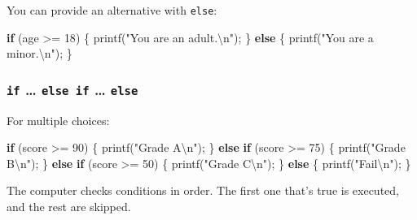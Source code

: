 \documentclass[
  letterpaper,
  DIV=11,
  numbers=noendperiod]{scrreprt}
\newenvironment{Shaded}{\begin{snugshade}}{\end{snugshade}}
\newcommand{\ControlFlowTok}[1]{\textcolor[rgb]{0.00,0.23,0.31}{\textbf{#1}}}
\newcommand{\DecValTok}[1]{\textcolor[rgb]{0.68,0.00,0.00}{#1}}
\newcommand{\NormalTok}[1]{\textcolor[rgb]{0.00,0.23,0.31}{#1}}
\newcommand{\OperatorTok}[1]{\textcolor[rgb]{0.37,0.37,0.37}{#1}}
\newcommand{\SpecialCharTok}[1]{\textcolor[rgb]{0.37,0.37,0.37}{#1}}
\newcommand{\StringTok}[1]{\textcolor[rgb]{0.13,0.47,0.30}{#1}}
\begin{document}
You can provide an alternative with \texttt{else}:

\begin{Shaded}
\begin{Highlighting}[]
\ControlFlowTok{if} \OperatorTok{(}\NormalTok{age }\OperatorTok{\textgreater{}=} \DecValTok{18}\OperatorTok{)} \OperatorTok{\{}
\NormalTok{    printf}\OperatorTok{(}\StringTok{"You are an adult.}\SpecialCharTok{\textbackslash{}n}\StringTok{"}\OperatorTok{);}
\OperatorTok{\}} \ControlFlowTok{else} \OperatorTok{\{}
\NormalTok{    printf}\OperatorTok{(}\StringTok{"You are a minor.}\SpecialCharTok{\textbackslash{}n}\StringTok{"}\OperatorTok{);}
\OperatorTok{\}}
\end{Highlighting}
\end{Shaded}

\subsubsection{\texorpdfstring{\texttt{if} \ldots{} \texttt{else\ if}
\ldots{}
\texttt{else}}{if \ldots{} else if \ldots{} else}}\label{if-else-if-else}

For multiple choices:

\begin{Shaded}
\begin{Highlighting}[]
\ControlFlowTok{if} \OperatorTok{(}\NormalTok{score }\OperatorTok{\textgreater{}=} \DecValTok{90}\OperatorTok{)} \OperatorTok{\{}
\NormalTok{    printf}\OperatorTok{(}\StringTok{"Grade A}\SpecialCharTok{\textbackslash{}n}\StringTok{"}\OperatorTok{);}
\OperatorTok{\}} \ControlFlowTok{else} \ControlFlowTok{if} \OperatorTok{(}\NormalTok{score }\OperatorTok{\textgreater{}=} \DecValTok{75}\OperatorTok{)} \OperatorTok{\{}
\NormalTok{    printf}\OperatorTok{(}\StringTok{"Grade B}\SpecialCharTok{\textbackslash{}n}\StringTok{"}\OperatorTok{);}
\OperatorTok{\}} \ControlFlowTok{else} \ControlFlowTok{if} \OperatorTok{(}\NormalTok{score }\OperatorTok{\textgreater{}=} \DecValTok{50}\OperatorTok{)} \OperatorTok{\{}
\NormalTok{    printf}\OperatorTok{(}\StringTok{"Grade C}\SpecialCharTok{\textbackslash{}n}\StringTok{"}\OperatorTok{);}
\OperatorTok{\}} \ControlFlowTok{else} \OperatorTok{\{}
\NormalTok{    printf}\OperatorTok{(}\StringTok{"Fail}\SpecialCharTok{\textbackslash{}n}\StringTok{"}\OperatorTok{);}
\OperatorTok{\}}
\end{Highlighting}
\end{Shaded}

The computer checks conditions in order. The first one that's true is
executed, and the rest are skipped.
\end{document}

